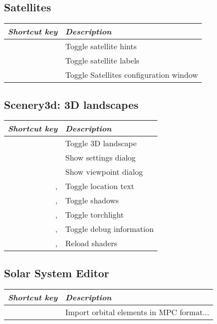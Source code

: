 \subsection{Satellites}
\label{ch:Hotkeys:Plugins:Satellites}
\begin{longtabu}to \textwidth {rl} 
\toprule
\emph{Shortcut key}	& \emph{Description}\\\midrule
{}		& Toggle satellite hints \\
	& Toggle satellite labels \\
			& Toggle Satellites configuration window \\
\bottomrule
\end{longtabu}

\subsection{Scenery3d: 3D landscapes}
\label{ch:Hotkeys:Plugins:Scenery3d}
\begin{longtabu}to \textwidth {rl} 
\toprule
\emph{Shortcut key}	& \emph{Description}\\\midrule
{}		& Toggle 3D landscape \\
	& Show settings dialog \\
	& Show viewpoint dialog \\
, 	& Toggle location text \\
, 	& Toggle shadows \\
, 	& Toggle torchlight \\
, 	& Toggle debug information \\
, 	& Reload shaders \\
\bottomrule
\end{longtabu}

\subsection{Solar System Editor}
\label{ch:Hotkeys:Plugins:SolarSystemEditor}
\begin{longtabu}to \textwidth {rl} 
\toprule
\emph{Shortcut key}	& \emph{Description}\\\midrule
{}	& Import orbital elements in MPC format... \\
\bottomrule
\end{longtabu}

